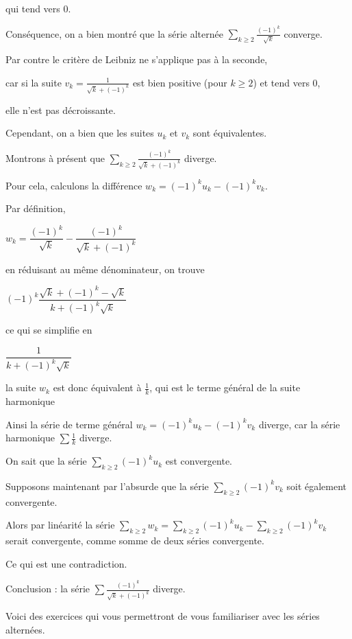 \change
qui tend vers $0$. 

\change
Conséquence, on a bien montré que la série alternée  $\sum_{k \ge 2}  \frac{(-1)^k}{\sqrt{k}}$ converge.

\change
Par contre le critère de Leibniz ne s'applique pas à la seconde, 

\change
car si la suite $v_k = \frac{1}{\sqrt{k}+(-1)^k}$ est bien
positive (pour $k \ge 2$) et tend vers $0$, 

\change
elle n'est pas décroissante. 

\change
Cependant, on a bien que les suites $u_k$ et $v_k$ sont équivalentes.


\diapo
Montrons à présent que $\sum_{k \ge 2} \frac{(-1)^k}{\sqrt{k}+(-1)^k}$ diverge.

\change
Pour cela, calculons la différence $w_k = (-1)^ku_k-(-1)^kv_k$. 

\change
Par définition,  

$w_k= \dfrac{(-1)^k}{\sqrt{k}}-\dfrac{(-1)^k}{\sqrt{k}+(-1)^k}$

\change
en réduisant au même dénominateur, on trouve

$ (-1)^k\dfrac{\sqrt{k}+(-1)^k-\sqrt{k}}{k+(-1)^k\sqrt{k}}  $

\change
ce qui se simplifie en 

$ \dfrac{1}{k+(-1)^k\sqrt{k}} $

\change
la suite $w_k $ est donc équivalent à $ \frac{1}{k} $, qui est le terme général de la suite harmonique

\change
Ainsi la série de terme général $w_k = (-1)^ku_k-(-1)^kv_k$
diverge, car la série harmonique $\sum \frac{1}{k}$ diverge.

\change
On sait que la série $\sum_{k \ge 2} (-1)^k u_k$
est convergente.

\change
Supposons maintenant par l'absurde que la série
$\sum_{k \ge 2}(-1)^k v_k$ soit également convergente.

\change
Alors par linéarité la série
$\sum_{k \ge 2} w_k = \sum_{k \ge 2} (-1)^k u_k - \sum_{k \ge 2} (-1)^k v_k$
serait convergente, comme somme de deux séries convergente.

\change
Ce qui est une contradiction.

\change
Conclusion : la série $\sum \frac{(-1)^k}{\sqrt{k}+(-1)^k}$ diverge.  

\diapo

Voici des exercices qui vous permettront de vous familiariser avec les séries alternées.


